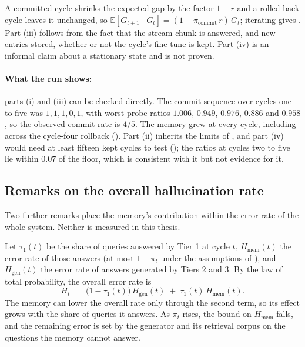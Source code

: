 \begin{sketch}
A committed cycle shrinks the expected gap by the factor $1-r$ and a rolled-back cycle leaves it unchanged, so $\mathbb{E}[G_{t+1} \mid G_t] = (1 - \pi_{\text{commit}}\, r)\, G_t$; iterating gives . Part (iii) follows from the fact that the stream chunk is answered, and new entries stored, whether or not the cycle's fine-tune is kept. Part (iv) is an informal claim about a stationary state and is not proven.
\end{sketch}

\paragraph{What the run shows:} parts (i) and (iii) can be checked directly. The commit sequence over cycles one to five was $1, 1, 1, 0, 1$, with worst probe ratios $1.006$, $0.949$, $0.976$, $0.886$ and $0.958$, so the observed commit rate is $4/5$. The memory grew at every cycle, including across the cycle-four rollback (). Part (ii) inherits the limits of , and part (iv) would need at least fifteen kept cycles to test (); the ratios at cycles two to five lie within $0.07$ of the floor, which is consistent with it but not evidence for it.

\subsection{Remarks on the overall hallucination rate}
\label{sec:theorem-scaffolding}

Two further remarks place the memory's contribution within the error rate of the whole system. Neither is measured in this thesis.

\begin{remark}
\label{thm:asymptotic-elim}
Let $\tau_{1}(t)$ be the share of queries answered by Tier 1 at cycle $t$, $H_{\text{mem}}(t)$ the error rate of those answers (at most $1 - \pi_t$ under the assumptions of ), and $H_{\text{gen}}(t)$ the error rate of answers generated by Tiers 2 and 3. By the law of total probability, the overall error rate is
\begin{equation}
H_t \;=\; \big(1 - \tau_{1}(t)\big) \, H_{\text{gen}}(t) \;+\; \tau_{1}(t) \, H_{\text{mem}}(t).
\label{eq:asymptotic-elim}
\end{equation}
The memory can lower the overall rate only through the second term, so its effect grows with the share of queries it answers. As $\pi_t$ rises, the bound on $H_{\text{mem}}$ falls, and the remaining error is set by the generator and its retrieval corpus on the questions the memory cannot answer.
\end{remark}

